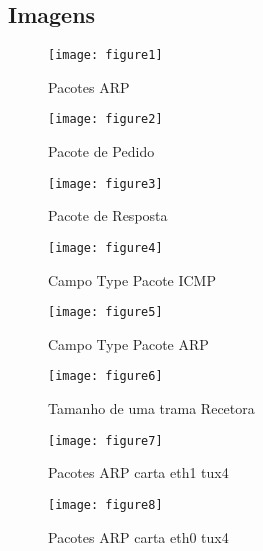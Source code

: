 \subsection*{Imagens}

\begin{figure}[ht]
	\texttt{[image: figure1]}                                                      
    \caption{Pacotes ARP}
    \label{fig:fig1}
\end{figure}

\begin{figure}[ht]
	\texttt{[image: figure2]}                                                      
    \caption{Pacote de Pedido}
    \label{fig:fig2}
\end{figure}

\begin{figure}[ht]
	\texttt{[image: figure3]}                                                      
    \caption{Pacote de Resposta}
    \label{fig:fig3}
\end{figure}

\begin{figure}[ht]
	\texttt{[image: figure4]}                                                      
    \caption{Campo Type Pacote ICMP}
    \label{fig:fig4}
\end{figure}

\begin{figure}[ht]
	\texttt{[image: figure5]}                                                      
    \caption{Campo Type Pacote ARP}
    \label{fig:fig5}
\end{figure}

\begin{figure}[ht]
	\texttt{[image: figure6]}                                                      
    \caption{Tamanho de uma trama Recetora}
    \label{fig:fig6}
\end{figure}

\begin{figure}[ht]
	\texttt{[image: figure7]}                                                      
    \caption{Pacotes ARP carta eth1 tux4}
    \label{fig:fig7}
\end{figure}

\begin{figure}[ht]
	\texttt{[image: figure8]}                                                      
    \caption{Pacotes ARP carta eth0 tux4}
    \label{fig:fig8}
\end{figure}

